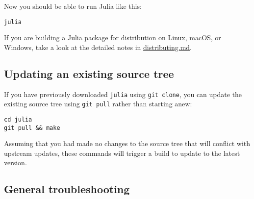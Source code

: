 Now you should be able to run Julia like this:




\begin{lstlisting}
julia
\end{lstlisting}



If you are building a Julia package for distribution on Linux, macOS, or Windows, take a look at the detailed notes in \href{https://github.com/JuliaLang/julia/blob/master/doc/src/devdocs/build/distributing.md}{distributing.md}.



\hypertarget{10318125723095277293}{}


\subsection{Updating an existing source tree}



If you have previously downloaded \texttt{julia} using \texttt{git clone}, you can update the existing source tree using \texttt{git pull} rather than starting anew:




\begin{lstlisting}
cd julia
git pull && make
\end{lstlisting}



Assuming that you had made no changes to the source tree that will conflict with upstream updates, these commands will trigger a build to update to the latest version.



\hypertarget{10270356017395204247}{}


\subsection{General troubleshooting}



